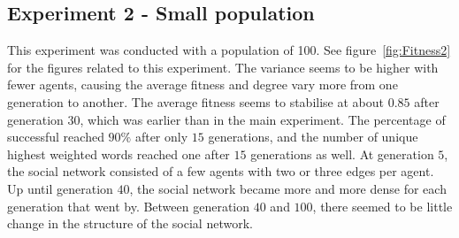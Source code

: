\subsection{Experiment 2 - Small population}
This experiment was conducted with a population of 100. See figure~\ref{fig:Fitness2} for the figures related to this experiment. The variance seems to be higher with fewer agents, causing the average fitness and degree vary more from one generation to another. The average fitness seems to stabilise at about $0.85$ after generation $30$, which was earlier than in the main experiment. The percentage of successful reached $90\%$ after only $15$ generations, and the number of unique highest weighted words reached one after $15$ generations as well. At generation $5$, the social network consisted of a few agents with two or three edges per agent. Up until generation $40$, the social network became more and more dense for each generation that went by. Between generation $40$ and $100$, there seemed to be little change in the structure of the social network.   

